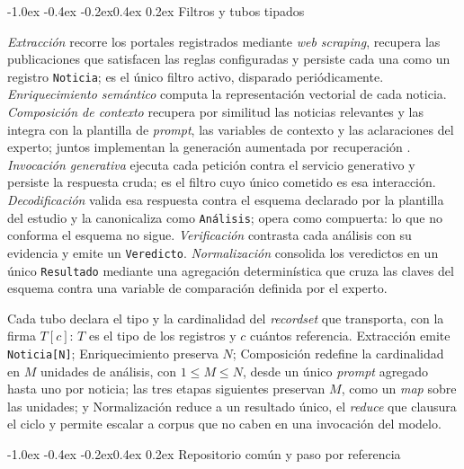\documentclass[12pt,a4paper,twocolumn]{article}
\makeatletter
\renewcommand\subsection{\@startsection{subsection}{2}{\z@}%
  {-1.0ex \@plus -0.4ex \@minus -0.2ex}{0.4ex \@plus 0.2ex}%
  {\normalfont\normalsize\bfseries\itshape}}
\makeatother
\begin{document}
\subsection{Filtros y tubos tipados}

\textit{Extracción} recorre los portales registrados mediante \textit{web scraping}, recupera las publicaciones que satisfacen las reglas configuradas y persiste cada una como un registro \texttt{Noticia}; es el único filtro activo, disparado periódicamente. \textit{Enriquecimiento semántico} computa la representación vectorial de cada noticia. \textit{Composición de contexto} recupera por similitud las noticias relevantes y las integra con la plantilla de \textit{prompt}, las variables de contexto y las aclaraciones del experto; juntos implementan la generación aumentada por recuperación \cite{lewis:2020}. \textit{Invocación generativa} ejecuta cada petición contra el servicio generativo y persiste la respuesta cruda; es el filtro cuyo único cometido es esa interacción. \textit{Decodificación} valida esa respuesta contra el esquema declarado por la plantilla del estudio y la canonicaliza como \texttt{Análisis}; opera como compuerta: lo que no conforma el esquema no sigue. \textit{Verificación} contrasta cada análisis con su evidencia y emite un \texttt{Veredicto}. \textit{Normalización} consolida los veredictos en un único \texttt{Resultado} mediante una agregación determinística que cruza las claves del esquema contra una variable de comparación definida por el experto.

Cada tubo declara el tipo y la cardinalidad del \textit{recordset} que transporta, con la firma \(T[c]\): \(T\) es el tipo de los registros y \(c\) cuántos referencia. Extracción emite \texttt{Noticia[N]}; Enriquecimiento preserva \(N\); Composición redefine la cardinalidad en \(M\) unidades de análisis, con \(1 \le M \le N\), desde un único \textit{prompt} agregado hasta uno por noticia; las tres etapas siguientes preservan \(M\), como un \textit{map} sobre las unidades; y Normalización reduce a un resultado único, el \textit{reduce} que clausura el ciclo y permite escalar a corpus que no caben en una invocación del modelo.

\subsection{Repositorio común y paso por referencia}
\end{document}
